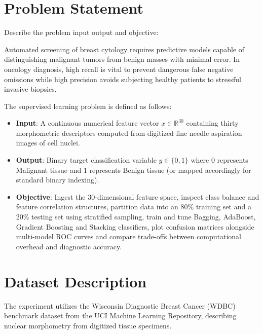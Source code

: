 \documentclass[12pt,a4paper]{article}
\begin{document}
\section{Problem Statement}
Describe the problem input output and objective:

Automated screening of breast cytology requires predictive models capable of distinguishing malignant tumors from benign masses with minimal error. In oncology diagnosis, high recall is vital to prevent dangerous false negative omissions while high precision avoids subjecting healthy patients to stressful invasive biopsies.

The supervised learning problem is defined as follows:
\begin{itemize}
\item \textbf{Input}: A continuous numerical feature vector $x \in \mathbb{R}^{30}$ containing thirty morphometric descriptors computed from digitized fine needle aspiration images of cell nuclei.
\item \textbf{Output}: Binary target classification variable $y \in \{0, 1\}$ where 0 represents Malignant tissue and 1 represents Benign tissue (or mapped accordingly for standard binary indexing).
\item \textbf{Objective}: Ingest the 30-dimensional feature space, inspect class balance and feature correlation structures, partition data into an 80\% training set and a 20\% testing set using stratified sampling, train and tune Bagging, AdaBoost, Gradient Boosting and Stacking classifiers, plot confusion matrices alongside multi-model ROC curves and compare trade-offs between computational overhead and diagnostic accuracy.
\end{itemize}

\section{Dataset Description}

The experiment utilizes the Wisconsin Diagnostic Breast Cancer (WDBC) benchmark dataset from the UCI Machine Learning Repository, describing nuclear morphometry from digitized tissue specimens.
\end{document}
